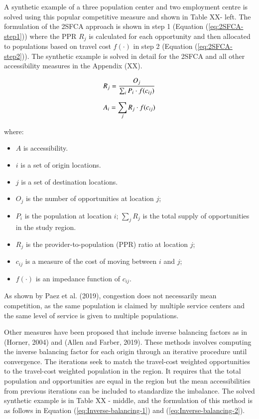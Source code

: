 \documentclass[]{elsarticle} %
\providecommand{\tightlist}{%
  \setlength{\itemsep}{0pt}\setlength{\parskip}{0pt}}
\begin{document}
A synthetic example of a three population center and two employment
centre is solved using this popular competitive measure and shown in
Table XX- left. The formulation of the 2SFCA approach is shown in step 1
(Equation (\ref{eq:2SFCA-step1})) where the PPR \(R_j\) is calculated
for each opportunity and then allocated to populations based on travel
cost \(f(\cdot)\) in step 2 (Equation (\ref{eq:2SFCA-step2})). The
synthetic example is solved in detail for the 2SFCA and all other
accessibility measures in the Appendix (XX).

\begin{equation}
\label{eq:2SFCA-step1}
R_{j} = \frac{O_{j}}{\sum_i P_{i} \cdot f(c_{ij})}\\
\end{equation}

\begin{equation}
\label{eq:2SFCA-step2}
A_{i} = {\sum_j R_{j} \cdot f(c_{ij})}\\
\end{equation}

\noindent where:

\begin{itemize}
\tightlist
\item
  \(A\) is accessibility.
\item
  \(i\) is a set of origin locations.
\item
  \(j\) is a set of destination locations.
\item
  \(O_j\) is the number of opportunities at location \(j\);
\item
  \(P_i\) is the population at location \(i\); \(\sum_j R_j\) is the
  total supply of opportunities in the study region.
\item
  \(R_j\) is the provider-to-population (PPR) ratio at location \(j\);
\item
  \(c_{ij}\) is a measure of the cost of moving between \(i\) and \(j\);
\item
  \(f(\cdot)\) is an impedance function of \(c_{ij}\).
\end{itemize}

As shown by Paez et al. (2019), congestion does not necessarily mean
competition, as the same population is claimed by multiple service
centers and the same level of service is given to multiple populations.

Other measures have been proposed that include inverse balancing factors
as in (Horner, 2004) and (Allen and Farber, 2019). These methods
involves computing the inverse balancing factor for each origin through
an iterative procedure until convergence. The iterations seek to match
the travel-cost weighted opportunities to the travel-cost weighted
population in the region. It requires that the total population and
opportunities are equal in the region but the mean accessibilities from
previous iterations can be included to standardize the imbalance. The
solved synthetic example is in Table XX - middle, and the formulation of
this method is as follows in Equation (\ref{eq:Inverse-balancing-1}) and
(\ref{eq:Inverse-balancing-2}).
\end{document}
